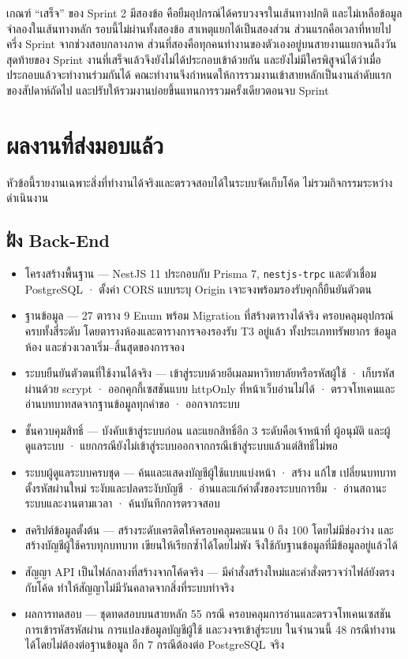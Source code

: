 เกณฑ์ ``เสร็จ'' ของ Sprint 2 มีสองข้อ คือยืมอุปกรณ์ได้ครบวงจรในเส้นทางปกติ และไม่เหลือข้อมูลจำลองในเส้นทางหลัก รอบนี้ไม่ผ่านทั้งสองข้อ สาเหตุแยกได้เป็นสองส่วน ส่วนแรกคือเวลาที่หายไปครึ่ง Sprint จากช่วงสอบกลางภาค ส่วนที่สองคือทุกคนทำงานของตัวเองอยู่บนสายงานแยกจนถึงวันสุดท้ายของ Sprint งานที่เสร็จแล้วจึงยังไม่ได้ประกอบเข้าด้วยกัน และยังไม่มีใครพิสูจน์ได้ว่าเมื่อประกอบแล้วจะทำงานร่วมกันได้ คณะทำงานจึงกำหนดให้การรวมงานเข้าสายหลักเป็นงานลำดับแรกของสัปดาห์ถัดไป และปรับให้รวมงานบ่อยขึ้นแทนการรวมครั้งเดียวตอนจบ Sprint

\section{ผลงานที่ส่งมอบแล้ว}

หัวข้อนี้รายงานเฉพาะสิ่งที่ทำงานได้จริงและตรวจสอบได้ในระบบจัดเก็บโค้ด ไม่รวมกิจกรรมระหว่างดำเนินงาน

\subsection{ฝั่ง Back-End}

\begin{itemize}
  \item โครงสร้างพื้นฐาน — NestJS 11 ประกอบกับ Prisma 7, \texttt{nestjs-trpc} และตัวเชื่อม PostgreSQL · ตั้งค่า CORS แบบระบุ Origin เจาะจงพร้อมรองรับคุกกี้ยืนยันตัวตน
  \item ฐานข้อมูล — 27 ตาราง 9 Enum พร้อม Migration ที่สร้างตารางได้จริง ครอบคลุมอุปกรณ์ครบทั้งสี่ระดับ โดยตารางห้องและตารางการจองรองรับ T3 อยู่แล้ว ทั้งประเภททรัพยากร ข้อมูลห้อง และช่วงเวลาเริ่ม–สิ้นสุดของการจอง
  \item ระบบยืนยันตัวตนที่ใช้งานได้จริง — เข้าสู่ระบบด้วยอีเมลมหาวิทยาลัยหรือรหัสผู้ใช้ · เก็บรหัสผ่านด้วย scrypt · ออกคุกกี้เซสชันแบบ httpOnly ที่หน้าเว็บอ่านไม่ได้ · ตรวจโทเคนและอ่านบทบาทสดจากฐานข้อมูลทุกคำขอ · ออกจากระบบ
  \item ชั้นควบคุมสิทธิ์ — บังคับเข้าสู่ระบบก่อน และแยกสิทธิ์อีก 3 ระดับคือเจ้าหน้าที่ ผู้อนุมัติ และผู้ดูแลระบบ · แยกกรณียังไม่เข้าสู่ระบบออกจากกรณีเข้าสู่ระบบแล้วแต่สิทธิ์ไม่พอ
  \item ระบบผู้ดูแลระบบครบชุด — ค้นและแสดงบัญชีผู้ใช้แบบแบ่งหน้า · สร้าง แก้ไข เปลี่ยนบทบาท ตั้งรหัสผ่านใหม่ ระงับและปลดระงับบัญชี · อ่านและแก้ค่าตั้งของระบบการยืม · อ่านสถานะระบบและงานตามเวลา · ค้นบันทึกการตรวจสอบ
  \item สคริปต์ข้อมูลตั้งต้น — สร้างระดับเครดิตให้ครอบคลุมคะแนน 0 ถึง 100 โดยไม่มีช่องว่าง และสร้างบัญชีผู้ใช้ครบทุกบทบาท เขียนให้เรียกซ้ำได้โดยไม่พัง จึงใช้กับฐานข้อมูลที่มีข้อมูลอยู่แล้วได้
  \item สัญญา API เป็นไฟล์กลางที่สร้างจากโค้ดจริง — มีคำสั่งสร้างใหม่และคำสั่งตรวจว่าไฟล์ยังตรงกับโค้ด ทำให้สัญญาไม่มีวันคลาดจากสิ่งที่ระบบทำจริง
  \item ผลการทดสอบ — ชุดทดสอบบนสายหลัก 55 กรณี ครอบคลุมการอ่านและตรวจโทเคนเซสชัน การเข้ารหัสรหัสผ่าน การแปลงข้อมูลบัญชีผู้ใช้ และวงจรเข้าสู่ระบบ ในจำนวนนี้ 48 กรณีทำงานได้โดยไม่ต้องต่อฐานข้อมูล อีก 7 กรณีต้องต่อ PostgreSQL จริง
\end{itemize}

